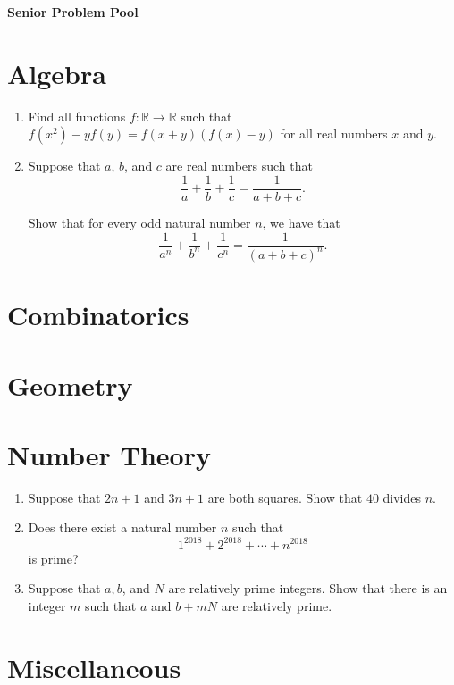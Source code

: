 \documentclass{article}
\begin{document}
\begin{center}
\textbf{\huge Senior Problem Pool}
\end{center}

\section*{Algebra}

\begin{enumerate}[1.]

\item %
Find all functions $f : \mathbb{R} \to \mathbb{R}$ such that $f(x^2) - yf(y) = f(x + y) (f(x) - y)$ for all real numbers $x$ and $y$. 


\item %

Suppose that $a$, $b$, and $c$ are real numbers such that
\[
  \frac{1}{a} + \frac{1}{b} + \frac{1}{c} = \frac{1}{a + b + c}.
\]

Show that for every odd natural number $n$, we have that
\[
  \frac{1}{a^n} + \frac{1}{b^n} + \frac{1}{c^n} = \frac{1}{{(a + b + c)}^n}.
  \]

\end{enumerate}

\section*{Combinatorics}

\section*{Geometry}

\section*{Number Theory}

\begin{enumerate}[1.]

\item %
Suppose that $2n + 1$ and $3n + 1$ are both squares. Show that $40$ divides $n$.


\item %
Does there exist a natural number $n$ such that
\[
	1^{2018} + 2^{2018} + \cdots + n^{2018}
\]
is prime?


\item %
Suppose that $a, b$, and $N$ are relatively prime integers. Show that there is an integer $m$ such that $a$ and $b + mN$ are relatively prime.


\end{enumerate}

\section*{Miscellaneous}
\end{document}
